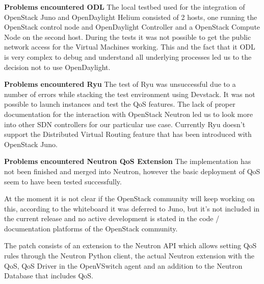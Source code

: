 \textbf{Problems encountered ODL}
The local testbed used for the integration of OpenStack Juno and OpenDaylight Helium consisted of 2 hosts, one running the OpenStack control node and OpenDaylight Controller and a OpenStack Compute Node on the second host. During the tests it was not possible to get the public network access for the Virtual Machines working. This and the fact that it ODL is very complex to debug and understand all underlying processes led us to the decision not to use OpenDaylight.

\textbf{Problems encountered Ryu}
The test of Ryu was unsuccessful due to a number of errors while stacking the test environment using Devstack. It was not possible to launch instances and test the QoS features. The lack of proper documentation for the interaction with OpenStack Neutron led us to look more into other SDN controllers for our particular use case. Currently
Ryu doesn't support the Distributed Virtual Routing feature that has been introduced with OpenStack Juno.

\textbf{Problems encountered Neutron QoS Extension}
The implementation has not been finished and merged into Neutron, however the basic deployment of QoS seem to have been tested successfully. 

At the moment it is not clear if the OpenStack community will keep working on this, according to the whiteboard it was deferred to Juno, but it's not included in the current release and no active development is stated in the code / documentation platforms of the OpenStack community.

The patch consists of an extension to the Neutron API which allows setting QoS rules through the Neutron Python client, the actual Neutron extension with the QoS, QoS Driver in the OpenVSwitch agent and an addition to the Neutron Database that includes QoS.

